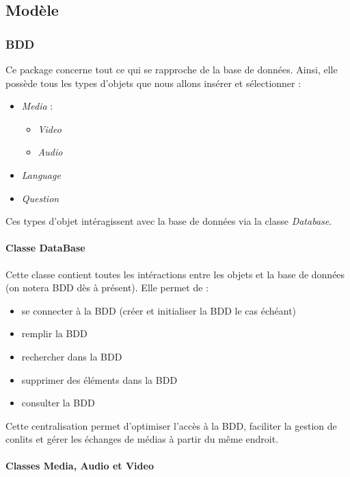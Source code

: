 \subsection{Modèle}\label{modele}


\subsubsection{BDD}

Ce package concerne tout ce qui se rapproche de la base de données. Ainsi, elle possède tous les types d'objets que nous allons insérer et sélectionner :
\begin{itemize}
 \item \textit{Media} :
 \begin{itemize}
  \item \textit{Video}
  \item \textit{Audio}
 \end{itemize}
 \item \textit{Language}
 \item \textit{Question}
\end{itemize}


Ces types d'objet intéragissent avec la base de données via la classe \textit{Database}.


\paragraph{Classe DataBase}

Cette classe contient toutes les intéractions entre les objets et la base de données (on notera BDD dès à présent). Elle permet de :

\begin{itemize}
 \item se connecter à la BDD (créer et initialiser la BDD le cas échéant)
 \item remplir la BDD
 \item rechercher dans la BDD
 \item supprimer des éléments dans la BDD
 \item consulter la BDD
\end{itemize}


Cette centralisation permet d'optimiser l'accès à la BDD, faciliter la gestion de conlits et gérer les échanges de médias à partir du même endroit.

\paragraph{Classes Media, Audio et Video}

